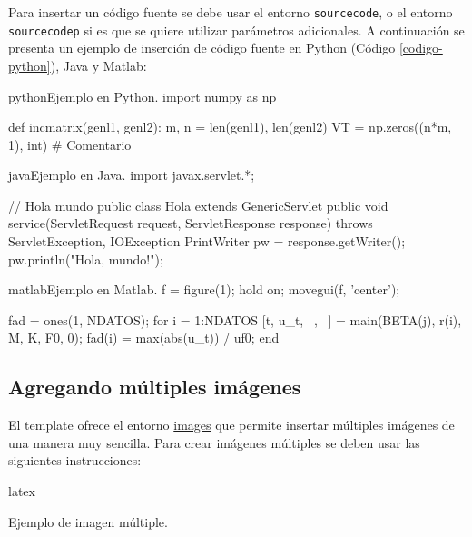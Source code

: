 	Para insertar un código fuente se debe usar el entorno \texttt{sourcecode}, o el entorno \texttt{sourcecodep} si es que se quiere utilizar parámetros adicionales. A continuación se presenta un ejemplo de inserción de código fuente en Python (Código \ref{codigo-python}), Java y Matlab:

\begin{sourcecode}[\label{codigo-python}]{python}{Ejemplo en Python.}
import numpy as np

def incmatrix(genl1, genl2):
	m, n = len(genl1), len(genl2)
	VT = np.zeros((n*m, 1), int) # Comentario
\end{sourcecode}

\begin{sourcecode}[]{java}{Ejemplo en Java.}
import javax.servlet.*;

// Hola mundo
public class Hola extends GenericServlet {
	public void service(ServletRequest request, ServletResponse response)
	throws ServletException, IOException{
		PrintWriter pw = response.getWriter();
		pw.println("Hola, mundo!");
	}
}
\end{sourcecode}

\begin{sourcecode}{matlab}{Ejemplo en Matlab.}
f = figure(1); hold on; movegui(f, 'center');

fad = ones(1, NDATOS); %
for i = 1:NDATOS
	[t, u_t, ~, ~] = main(BETA(j), r(i), M, K, F0, 0);
	fad(i) = max(abs(u_t)) / uf0;
end
\end{sourcecode}

\subsection{Agregando múltiples imágenes}

	El template ofrece el entorno \href{https://template-latex.github.io/informe#hlp-images}{images} que permite insertar múltiples imágenes de una manera muy sencilla. Para crear imágenes múltiples se deben usar las siguientes instrucciones:

\begin{sourcecode}{latex}{}
\begin{images}[\label{imagenmultiple}]{Ejemplo de imagen múltiple.}
	\imagesnewline
\end{images}
\end{sourcecode}

